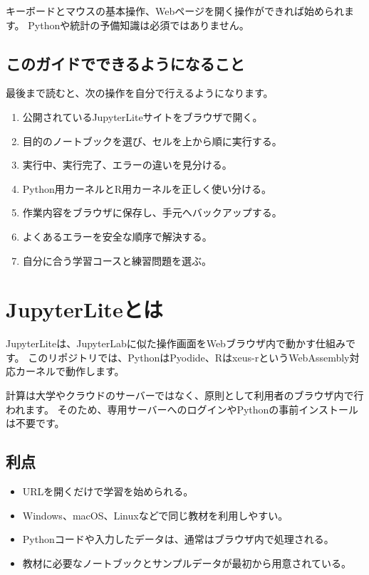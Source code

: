 \documentclass[a4paper,11pt]{ltjsarticle}
\begin{document}
キーボードとマウスの基本操作、Webページを開く操作ができれば始められます。
Pythonや統計の予備知識は必須ではありません。

\subsection{このガイドでできるようになること}

最後まで読むと、次の操作を自分で行えるようになります。

\begin{enumerate}
  \item 公開されているJupyterLiteサイトをブラウザで開く。
  \item 目的のノートブックを選び、セルを上から順に実行する。
  \item 実行中、実行完了、エラーの違いを見分ける。
  \item Python用カーネルとR用カーネルを正しく使い分ける。
  \item 作業内容をブラウザに保存し、手元へバックアップする。
  \item よくあるエラーを安全な順序で解決する。
  \item 自分に合う学習コースと練習問題を選ぶ。
\end{enumerate}

\section{JupyterLiteとは}

JupyterLiteは、JupyterLabに似た操作画面をWebブラウザ内で動かす仕組みです。
このリポジトリでは、PythonはPyodide、Rはxeus-rというWebAssembly対応カーネルで動作します。

\begin{pointbox}[通常のJupyterとの大きな違い]
計算は大学やクラウドのサーバーではなく、原則として利用者のブラウザ内で行われます。
そのため、専用サーバーへのログインやPythonの事前インストールは不要です。
\end{pointbox}

\subsection{利点}

\begin{itemize}
  \item URLを開くだけで学習を始められる。
  \item Windows、macOS、Linuxなどで同じ教材を利用しやすい。
  \item Pythonコードや入力したデータは、通常はブラウザ内で処理される。
  \item 教材に必要なノートブックとサンプルデータが最初から用意されている。
\end{itemize}
\end{document}
